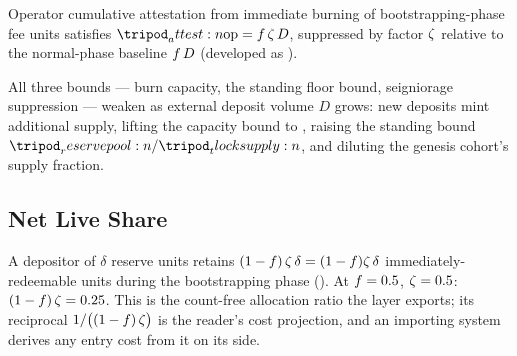 \documentclass[../main.tex]{subfiles}
\begin{document}
\begin{proposition}
    \label{prop:containment:seigniorage-suppression}
    Operator cumulative attestation from immediate burning of bootstrapping-phase fee units
    satisfies $\attest{\opidx} = \feerate\,\livesplit\,D$, suppressed by factor
    $\zeta$ relative to the normal-phase baseline $f\,D$ (developed as
    ).
\end{proposition}

\begin{proposition}
    \label{prop:containment:monotone-weakening}
    All three bounds --- burn capacity, the standing floor bound, seigniorage suppression
    --- weaken as external deposit volume $D$ grows: new deposits mint additional supply,
    lifting the capacity bound to
    , raising the standing bound
    $\reservepool{}/\tlocksupply{}$, and diluting the genesis cohort's supply fraction.
\end{proposition}

\subsection{Net Live Share}
\label{sec:containment:net-live-share}

%
A depositor of $\delta$ reserve units retains
$ (1-f)\,\zeta \,\delta = (1-f)\zeta\,\delta$ immediately-redeemable \liveclass{}
units during the bootstrapping phase (). At
$f = 0.5$, $\zeta = 0.5$: $ (1-f)\,\zeta  = 0.25$. This is the count-free
allocation ratio the layer exports; its reciprocal $ 1/\bigl((1-f)\,\zeta\bigr) $ is the reader's cost
projection, and an importing system derives any entry cost from it on its side.
\end{document}
